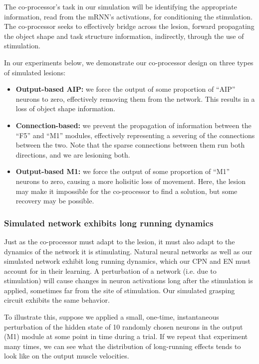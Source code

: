 \documentclass[12pt]{iopart}
\begin{document}
The co-processor's task in our simulation will be identifying the appropriate information,
read from the mRNN's activations, for conditioning the stimulation. The co-processor seeks
to effectively bridge across the lesion, forward propagating the object shape and task
structure information, indirectly, through the use of stimulation.

In our experiments below, we demonstrate our co-processor design on three types of
simulated lesions:
\begin{itemize}
	\item \textbf{Output-based AIP:} we force the output of some proportion of ``AIP''
	      neurons to zero, effectively removing them from the network. This results in a
	      loss of object shape information.
	\item \textbf{Connection-based:} we prevent the propagation of
	      information between the ``F5'' and ``M1'' modules, effectively representing a
	      severing of the connections between the two. Note that the sparse connections
	      between them run both directions, and we are lesioning both.
	\item \textbf{Output-based M1:} we force the output of some proportion of ``M1''
	      neurons to zero, causing a more holisitic loss of movement. Here, the lesion
	      may make it impossible for the co-processor to find a solution, but some
	      recovery may be possible.
\end{itemize}

\subsubsection{Simulated network exhibits long running dynamics}
Just as the co-processor must adapt to the lesion, it must also adapt to the dynamics of
the network it is stimulating. Natural neural networks as well as our simulated network
exhibit long running dynamics, which our CPN and EN must account for in their learning.
A perturbation of a network (i.e. due to stimulation) will cause changes in neuron
activations long after the stimulation is applied, sometimes far from the site of
stimulation. Our simulated grasping circuit exhibits the same behavior.

To illustrate this, suppose we applied a small, one-time, instantaneous perturbation
of the hidden state of 10 randomly chosen neurons in the output (M1) module at some point
in time during a trial. If we repeat that experiment many times, we can see what the
distribution of long-running effects tends to look like on the output muscle velocities.
\end{document}
